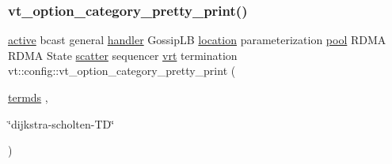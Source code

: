 \subsubsection{\texorpdfstring{vt\+\_\+option\+\_\+category\+\_\+pretty\+\_\+print()}{vt\_option\_category\_pretty\_print()}\hspace{0.1cm}{\footnotesize\ttfamily [14/16]}}
{\footnotesize\ttfamily \hyperlink{namespacevt_1_1config_a6bd1d6215bda0d8ca02811798399f689a82f77c67af0c363709010c6df4dbd920}{active} bcast general \hyperlink{namespacevt_1_1config_a6bd1d6215bda0d8ca02811798399f689a82a0081a94d5c5dfd18b0b3f7eca64b7}{handler} Gossip\+LB \hyperlink{namespacevt_1_1config_a6bd1d6215bda0d8ca02811798399f689aa8d8501591ca3859c828489054b17640}{location} parameterization \hyperlink{namespacevt_1_1config_a6bd1d6215bda0d8ca02811798399f689a50ba0efa092380eb92cee1d921d6e40f}{pool} R\+D\+MA R\+D\+MA State \hyperlink{namespacevt_1_1config_a6bd1d6215bda0d8ca02811798399f689ab0821d060501c20d94b8d700df7fdd76}{scatter} sequencer \hyperlink{namespacevt_1_1config_a6bd1d6215bda0d8ca02811798399f689a012d139c89a14e56a85f32fd82e7c7d3}{vrt} termination vt\+::config\+::vt\+\_\+option\+\_\+category\+\_\+pretty\+\_\+print (\begin{DoxyParamCaption}\item[{\hyperlink{namespacevt_1_1config_a6bd1d6215bda0d8ca02811798399f689a090cc992096e116d6ea7768dbb803dcb}{termds}}]{,  }\item[{\char`\"{}dijkstra-\/scholten-\/TD\char`\"{}}]{ }\end{DoxyParamCaption})}

\mbox{\label{namespacevt_1_1config_a7eb550e76deb3c4e999c3620be9e6c4a}} 
